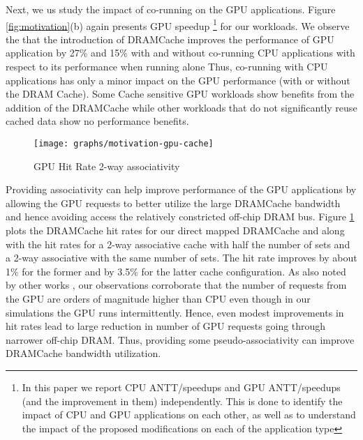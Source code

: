 \par Next, we us study the impact of co-running on the GPU applications.  Figure \ref{fig:motivation}(b) again presents GPU speedup \footnote{In this 
paper we report CPU ANTT/speedups and GPU ANTT/speedups (and the improvement in them) independently. This is done to identify the impact of CPU 
and GPU applications on each other, as well as to understand the impact of the proposed modifications on each of the application
type} 
for our workloads. 
We observe the that the introduction of DRAMCache improves the performance of GPU application by 27\% and 15\% with and without co-running CPU applications with respect to its performance when running alone
Thus,  co-running with CPU applications has only a minor impact on the GPU performance (with or without the DRAM Cache). 
Some Cache sensitive GPU workloads show benefits from the addition of the DRAMCache while other workloads that do not significantly reuse cached data show no performance benefits.
\begin{figure}[htbp]
   \texttt{[image: graphs/motivation-gpu-cache]}
   \caption{GPU Hit Rate 2-way associativity}
   \label{fig:motivation-gpu-cache}
\end{figure}
Providing associativity can help improve performance of the GPU applications by allowing the GPU requests to better utilize the large  DRAMCache bandwidth and hence avoiding access the relatively constricted off-chip DRAM bus. Figure \ref{fig:motivation-gpu-cache} plots the DRAMCache hit rates for our direct mapped DRAMCache and along with the hit rates for a 2-way associative cache with half the number of sets and a 2-way associative with the same number of sets. The hit rate improves by about 1\% for the former and by 3.5\% for the latter cache configuration. As also noted by other works \cite{oscar}, our observations corroborate that the number of requests from the GPU are orders of magnitude higher than CPU even though in our simulations the GPU runs intermittently. Hence, even modest improvements in hit rates lead to large reduction in number of GPU requests going through narrower off-chip DRAM. Thus, providing some pseudo-associativity can improve DRAMCache bandwidth utilization.


